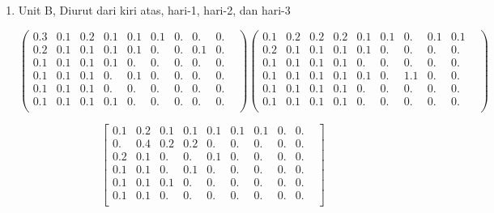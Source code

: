 \documentclass[12pt,]{article}
\begin{document}
\begin{enumerate}
\[\begin{matrix}
			0.1&0.1&0.1&0.&0.&0.&0.&0.&0.&\\

			0.1&0.1&0.1&0.1&0.&0.&0.&0.&0.&\\

			0.2&0.1&0.1&0.&0.&0.&0.&0.&0.&\\

			0.1&0.&0.1&0.&0.1&0.&0.&0.&0.&\\
		\end{matrix}
		\right]\]

		\newpage
		\item Unit B, Diurut dari kiri atas, hari-1, hari-2, dan hari-3

		\[ \left( \begin{matrix}
			0.3&0.1&0.2&0.1&0.1&0.1&0.&0.&0.&\\

			0.2&0.1&0.1&0.1&0.1&0.&0.&0.1&0.&\\

			0.1&0.1&0.1&0.1&0.&0.&0.&0.&0.&\\

			0.1&0.1&0.1&0.&0.1&0.&0.&0.&0.&\\

			0.1&0.1&0.1&0.&0.&0.&0.&0.&0.&\\

			0.1&0.1&0.1&0.1&0.&0.&0.&0.&0.&\\
		\end{matrix} \right)
		\left( \begin{matrix}
			0.1&0.2&0.2&0.2&0.1&0.1&0.&0.1&0.1\\

			0.2&0.1&0.1&0.1&0.1&0.&0.&0.&0.&\\

			0.1&0.1&0.1&0.1&0.&0.&0.&0.&0.&\\

			0.1&0.1&0.1&0.1&0.1&0.&1.1&0.&0.&\\

			0.1&0.1&0.1&0.1&0.&0.&0.&0.&0.&\\

			0.1&0.1&0.1&0.1&0.&0.&0.&0.&0.&\\
		\end{matrix} \right)
		\]

		\[\left[
		\begin{matrix}
			0.1&0.2&0.1&0.1&0.1&0.1&0.1&0.&0.&\\

			0.&0.4&0.2&0.2&0.&0.&0.&0.&0.&\\

			0.2&0.1&0.&0.&0.1&0.&0.&0.&0.&\\

			0.1&0.1&0.&0.1&0.&0.&0.&0.&0.&\\

			0.1&0.1&0.1&0.&0.&0.&0.&0.&0.&\\

			0.1&0.1&0.&0.&0.&0.&0.&0.&0.&\\
		\end{matrix}
		\right]\]

	\end{enumerate}
\end{document}
